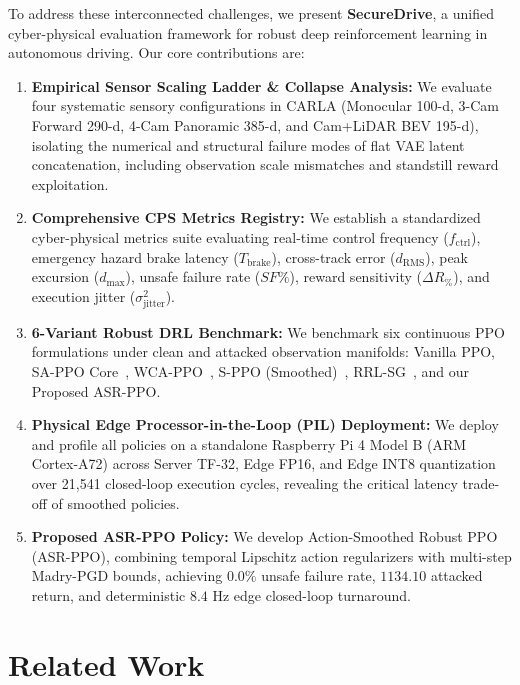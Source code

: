 \documentclass[conference]{IEEEtran}
\begin{document}
To address these interconnected challenges, we present \textbf{SecureDrive}, a unified cyber-physical evaluation framework for robust deep reinforcement learning in autonomous driving. Our core contributions are:
\begin{enumerate}
    \item \textbf{Empirical Sensor Scaling Ladder \& Collapse Analysis:} We evaluate four systematic sensory configurations in CARLA (Monocular 100-d, 3-Cam Forward 290-d, 4-Cam Panoramic 385-d, and Cam+LiDAR BEV 195-d), isolating the numerical and structural failure modes of flat VAE latent concatenation, including observation scale mismatches and standstill reward exploitation.
    \item \textbf{Comprehensive CPS Metrics Registry:} We establish a standardized cyber-physical metrics suite evaluating real-time control frequency ($f_{\text{ctrl}}$), emergency hazard brake latency ($T_{\text{brake}}$), cross-track error ($d_{\text{RMS}}$), peak excursion ($d_{\max}$), unsafe failure rate ($SF\%$), reward sensitivity ($\Delta R_\%$), and execution jitter ($\sigma^2_{\text{jitter}}$).
    \item \textbf{6-Variant Robust DRL Benchmark:} We benchmark six continuous PPO formulations under clean and attacked observation manifolds: Vanilla PPO, SA-PPO Core~\cite{zhang2020sa}, WCA-PPO~\cite{liang2022wocar}, S-PPO (Smoothed)~\cite{sun2024breaking}, RRL-SG~\cite{he2024trustworthy}, and our Proposed ASR-PPO.
    \item \textbf{Physical Edge Processor-in-the-Loop (PIL) Deployment:} We deploy and profile all policies on a standalone Raspberry Pi 4 Model B (ARM Cortex-A72) across Server TF-32, Edge FP16, and Edge INT8 quantization over 21,541 closed-loop execution cycles, revealing the critical latency trade-off of smoothed policies.
    \item \textbf{Proposed ASR-PPO Policy:} We develop Action-Smoothed Robust PPO (ASR-PPO), combining temporal Lipschitz action regularizers with multi-step Madry-PGD bounds, achieving $0.0\%$ unsafe failure rate, $1134.10$ attacked return, and deterministic $8.4\text{ Hz}$ edge closed-loop turnaround.
\end{enumerate}

\section{Related Work}
\end{document}
